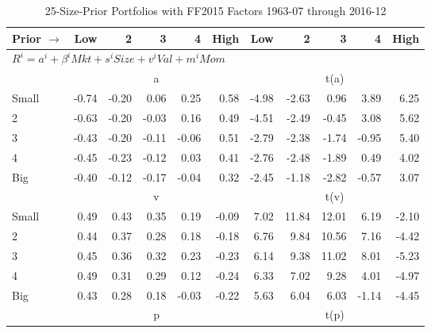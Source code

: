
\begin{table}[!ht]
\centering
\caption{25-Size-Prior Portfolios with FF2015 Factors 1963-07 through 2016-12}
\begin{tabular}{lrrrrrrrrrr}
  \toprule
    Prior $\rightarrow$ & Low & 2 & 3 & 4 & High & Low & 2 & 3 & 4 & High \\ 
  \midrule
  \multicolumn{11}{l}{$R^i=a^i+\beta^iMkt+s^iSize+v^iVal+m^iMom$} \\

  
    
      & \multicolumn{5}{c}{a} & \multicolumn{5}{c}{t(a)}
    
    \\
      \cmidrule(r){2-6} \cmidrule(r){7-11}

    Small   & -0.74  & -0.20  & 0.06  & 0.25  & 0.58  & -4.98  & -2.63  & 0.96  & 3.89  & 6.25  \\
         2  & -0.63  & -0.20  & -0.03  & 0.16  & 0.49  & -4.51  & -2.49  & -0.45  & 3.08  & 5.62  \\
         3  & -0.43  & -0.20  & -0.11  & -0.06  & 0.51  & -2.79  & -2.38  & -1.74  & -0.95  & 5.40  \\
         4  & -0.45  & -0.23  & -0.12  & 0.03  & 0.41  & -2.76  & -2.48  & -1.89  & 0.49  & 4.02  \\
    Big     & -0.40  & -0.12  & -0.17  & -0.04  & 0.32  & -2.45  & -1.18  & -2.82  & -0.57  & 3.07  \\

  
    
      & \multicolumn{5}{c}{v} & \multicolumn{5}{c}{t(v)}
    
    \\
      \cmidrule(r){2-6} \cmidrule(r){7-11}

    Small   & 0.49  & 0.43  & 0.35  & 0.19  & -0.09  & 7.02  & 11.84  & 12.01  & 6.19  & -2.10  \\
         2  & 0.44  & 0.37  & 0.28  & 0.18  & -0.18  & 6.76  & 9.84  & 10.56  & 7.16  & -4.42  \\
         3  & 0.45  & 0.36  & 0.32  & 0.23  & -0.23  & 6.14  & 9.38  & 11.02  & 8.01  & -5.23  \\
         4  & 0.49  & 0.31  & 0.29  & 0.12  & -0.24  & 6.33  & 7.02  & 9.28  & 4.01  & -4.97  \\
    Big     & 0.43  & 0.28  & 0.18  & -0.03  & -0.22  & 5.63  & 6.04  & 6.03  & -1.14  & -4.45  \\

  
    
      & \multicolumn{5}{c}{p} & \multicolumn{5}{c}{t(p)}
    

\end{tabular}
\end{table}
